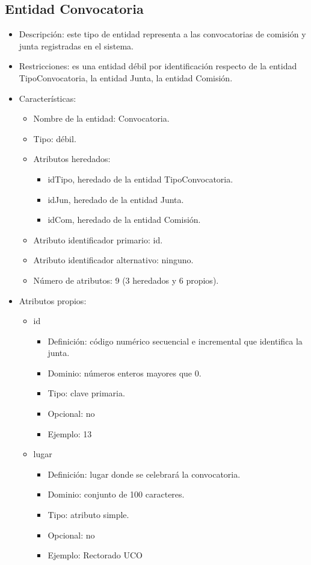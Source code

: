 \subsection{Entidad Convocatoria}
\begin{itemize}
    \item Descripción: este tipo de entidad representa a las convocatorias de comisión y junta registradas en el sistema.
    \item Restricciones: es una entidad débil por identificación respecto de la entidad TipoConvocatoria, la entidad Junta, la entidad Comisión.
    \item Características:
    \begin{itemize}
        \item Nombre de la entidad: Convocatoria.
        \item Tipo: débil.
        \item Atributos heredados: 
        \begin{itemize}
            \item idTipo, heredado de la entidad TipoConvocatoria. 
            \item idJun, heredado de la entidad Junta. 
            \item idCom, heredado de la entidad Comisión.
        \end{itemize}
        \item Atributo identificador primario: id.
        \item Atributo identificador alternativo: ninguno.
        \item Número de atributos: 9 (3 heredados y 6 propios).
    \end{itemize}

    \item Atributos propios:
    \begin{itemize}
        \item id
        \begin{itemize}
            \item Definición: código numérico secuencial e incremental que identifica la junta.
            \item Dominio: números enteros mayores que 0.
            \item Tipo: clave primaria.
            \item Opcional: no
            \item Ejemplo: 13
        \end{itemize}

         \item lugar
        \begin{itemize}
            \item Definición: lugar donde se celebrará la convocatoria.
            \item Dominio: conjunto de 100 caracteres.
            \item Tipo: atributo simple.
            \item Opcional: no
            \item Ejemplo: Rectorado UCO
        \end{itemize}


\end{itemize}
\end{itemize}
